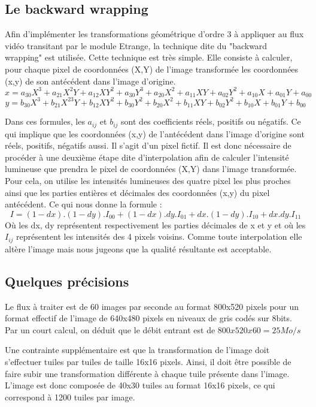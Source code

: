 \documentclass[a4paper,12pt]{report}
\begin{document}
\newpage

	\subsection{Le backward wrapping}

{Afin d'implémenter les transformations géométrique d'ordre 3 à appliquer au flux vidéo transitant par le module Etrange, la technique dite du "backward wrapping" est utilisée. Cette technique est très simple. Elle consiste à calculer, pour chaque pixel de coordonnées (X,Y) de l'image transformée les coordonnées (x,y) de son antécédent dans l'image d'origine.
\newline
\newline
$$
x = a_{30}X^3 + a_{21}X^2Y + a_{12}XY^2 + a_{30}Y^3
  + a_{20}X^2 + a_{11}XY  + a_{02}Y^2
  + a_{10}X  + a_{01}Y
  + a_{00}
$$
$$
y = b_{30}X^3 + b_{21}X^23Y + b_{12}XY^2 + b_{30}Y^2
  + b_{20}X^2 + b_{11}XY  + b_{02}Y^2
  + b_{10}X  + b_{01}Y
  + b_{00}
$$

{Dans ces formules, les $a_{ij}$ et $b_{ij}$ sont des coefficients réels, positifs ou négatifs. Ce qui implique que les coordonnées (x,y) de l'antécédent dans l'image d'origine sont réels, positifs, négatifs aussi. Il s'agit d'un pixel fictif.
Il est donc nécessaire de procéder à une deuxième étape dite d'interpolation afin de calculer l'intensité lumineuse que prendra le pixel de coordonnées (X,Y) dans l'image transformée. Pour cela, on utilise les intensités lumineuses des quatre pixel les plus proches ainsi que les parties entières et décimales des coordonnées (x,y) du pixel antécédent. Ce qui nous donne la formule :
\newline
$$
I = (1-dx).(1-dy).I_{00} + (1-dx).dy.I_{01} + dx.(1-dy).I_{10} + dx.dy.I_{11}
$$
\newline
Où les dx, dy représentent respectivement les parties décimales de x et y et où les $I_{ij}$ représentent les intensités des 4 pixels voisins. Comme toute interpolation elle altère l'image mais nous jugeons que la qualité résultante est acceptable.
}
	\subsection{Quelques précisions}
{
Le flux à traiter est de 60 images par seconde au format 800x520 pixels pour un format effectif de l'image de 640x480 pixels en niveaux de gris codés sur 8bits. Par un court calcul, on déduit que le débit entrant est de $800x520x60 = 25 Mo/s$


Une contrainte supplémentaire est que la transformation de l'image doit s'effectuer tuiles par tuiles de taille 16x16 pixels. Ainsi, il doit être possible de faire subir une transformation différente à chaque tuile présente dans l'image. L'image est donc composée de 40x30 tuiles au format 16x16 pixels, ce qui correspond à 1200 tuiles par image.


}}
\end{document}
